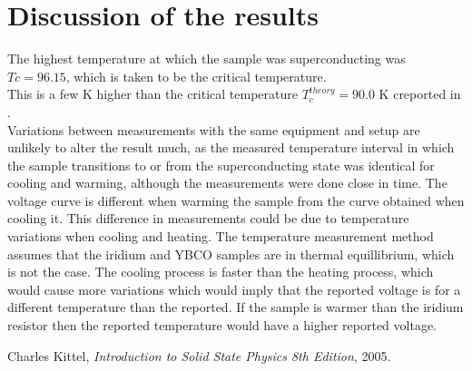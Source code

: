 \documentclass[a4paper,twoside=false,abstract=false,numbers=noenddot,
titlepage=false,headings=small,parskip=half,version=last]{scrartcl}
\begin{document}
\section{Discussion of the results}
The highest temperature at which the sample was superconducting was $Tc = 96.15$, which is taken to be the critical temperature.\\
This is a few K higher than the critical temperature $T_c^{theory}=90.0$ K creported in \cite{Kittel}.\\
Variations between measurements with the same equipment and setup are unlikely to alter the result much, as the measured temperature interval in which the sample transitions to or from the superconducting state was identical for cooling and warming, although the measurements were done close in time.
The voltage curve is different when warming the sample from the curve obtained when cooling it.
This difference in measurements could be due to temperature variations when cooling and heating.
The temperature measurement method assumes that the iridium and YBCO samples are in thermal equillibrium, which is not the case.
The cooling process is faster than the heating process, which would cause more variations which would imply that the reported voltage is for a different temperature than the reported.
If the sample is warmer than the iridium resistor then the reported temperature would have a higher reported voltage.

\begin{thebibliography}{1}
        Charles Kittel,
        {\em Introduction to Solid State Physics 8th Edition},
        2005.
\end{thebibliography}
\end{document}
